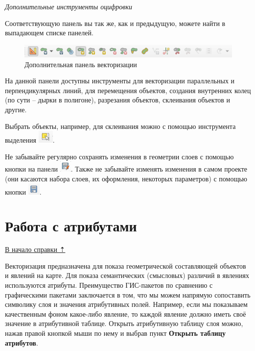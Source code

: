\documentclass[
  12pt,
]{book}
\begin{document}
\emph{Дополнительные инструменты оцифровки}

Соответствующую панель вы так же, как и предыдущую, можете найти в выпадающем списке панелей.

\begin{figure}
\centering
\includegraphics{images/vector/Additional_panel.png}
\caption{Дополнительная панель векторизации}
\end{figure}

На данной панели доступны инструменты для векторизации параллельных и перпендикулярных линий, для перемещения объектов, создания внутренних колец (по сути -- дырки в полигоне), разрезания объектов, склеивания объектов и другие.

Выбрать объекты, например, для склеивания можно с помощью инструмента выделения \includegraphics{images/vector/Selection_tool.png}.

Не забывайте регулярно сохранять изменения в геометрии слоев с помощью кнопки на панели \includegraphics{images/vector/Save_edits.png}. Также не забывайте изменять изменения в самом проекте (они касаются набора слоев, их оформления, некоторых параметров) с помощью кнопки \includegraphics{images/vector/Save_project.png}.

\section{Работа с атрибутами}\label{digitize-attributes}

\hyperref[digitize]{В начало справки ⇡}

Векторизация предназначена для показа геометрической составляющей объектов и явлений на карте. Для показа семантических (смысловых) различий в явлениях используются атрибуты. Преимущество ГИС-пакетов по сравнению с графическими пакетами заключается в том, что мы можем напрямую сопоставить символику слоя и значения атрибутивных полей. Например, если мы показываем качественным фоном какое-либо явление, то каждой явление должно иметь своё значение в атрибутивной таблице. Открыть атрибутивную таблицу слоя можно, нажав правой кнопкой мыши по нему и выбрав пункт \textbf{Открыть таблицу атрибутов}.
\end{document}
